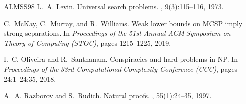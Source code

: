 \documentclass[11pt,letterpaper]{article}
\begin{document}
\begin{thebibliography}{ALMSS98}
L.~A. Levin.
\newblock Universal search problems.
, 9(3):115--116, 1973.

C.~McKay, C.~Murray, and R.~Williams.
\newblock Weak lower bounds on {MCSP} imply strong separations.
\newblock In {\em Proceedings of the 51st Annual ACM Symposium on Theory of Computing (STOC)}, pages 1215--1225, 2019.

I.~C. Oliveira and R.~Santhanam.
\newblock Conspiracies and hard problems in {NP}.
\newblock In {\em Proceedings of the 33rd Computational Complexity Conference (CCC)}, pages 24:1--24:35, 2018.

A.~A. Razborov and S.~Rudich.
\newblock Natural proofs.
, 55(1):24--35, 1997.

\end{thebibliography}
\end{document}
